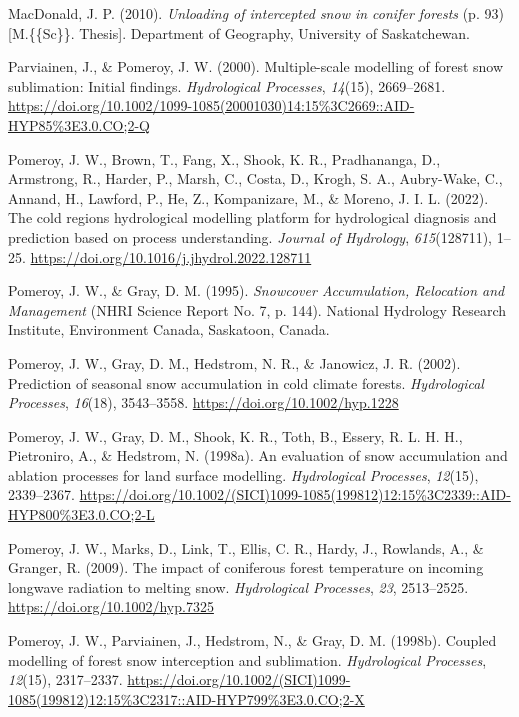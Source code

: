 \documentclass[
]{agujournal2019}
\newlength{\cslhangindent}
\newenvironment{CSLReferences}[2] %
 {\begin{list}{}{%
  \setlength{\itemindent}{0pt}
  \setlength{\leftmargin}{0pt}
  \setlength{\parsep}{0pt}
  \ifodd #1
   \setlength{\leftmargin}{\cslhangindent}
   \setlength{\itemindent}{-1\cslhangindent}
  \fi
  \setlength{\itemsep}{#2\baselineskip}}}
 {\end{list}}
\begin{document}
\begin{CSLReferences}{1}{0}
MacDonald, J. P. (2010). \emph{Unloading of intercepted snow in conifer
forests} (p. 93) {[}M.\{\{Sc\}\}. Thesis{]}. Department of Geography,
University of Saskatchewan.

Parviainen, J., \& Pomeroy, J. W. (2000). Multiple-scale modelling of
forest snow sublimation: {Initial} findings. \emph{Hydrological
Processes}, \emph{14}(15), 2669--2681.
\url{https://doi.org/10.1002/1099-1085(20001030)14:15\%3C2669::AID-HYP85\%3E3.0.CO;2-Q}

Pomeroy, J. W., Brown, T., Fang, X., Shook, K. R., Pradhananga, D.,
Armstrong, R., Harder, P., Marsh, C., Costa, D., Krogh, S. A.,
Aubry-Wake, C., Annand, H., Lawford, P., He, Z., Kompanizare, M., \&
Moreno, J. I. L. (2022). The cold regions hydrological modelling
platform for hydrological diagnosis and prediction based on process
understanding. \emph{Journal of Hydrology}, \emph{615}(128711), 1--25.
\url{https://doi.org/10.1016/j.jhydrol.2022.128711}

Pomeroy, J. W., \& Gray, D. M. (1995). \emph{Snowcover {Accumulation},
{Relocation} and {Management}} (NHRI Science Report No. 7, p. 144).
National Hydrology Research Institute, Environment Canada, Saskatoon,
Canada.

Pomeroy, J. W., Gray, D. M., Hedstrom, N. R., \& Janowicz, J. R. (2002).
Prediction of seasonal snow accumulation in cold climate forests.
\emph{Hydrological Processes}, \emph{16}(18), 3543--3558.
\url{https://doi.org/10.1002/hyp.1228}

Pomeroy, J. W., Gray, D. M., Shook, K. R., Toth, B., Essery, R. L. H.
H., Pietroniro, A., \& Hedstrom, N. (1998a). An evaluation of snow
accumulation and ablation processes for land surface modelling.
\emph{Hydrological Processes}, \emph{12}(15), 2339--2367.
\url{https://doi.org/10.1002/(SICI)1099-1085(199812)12:15\%3C2339::AID-HYP800\%3E3.0.CO;2-L}

Pomeroy, J. W., Marks, D., Link, T., Ellis, C. R., Hardy, J., Rowlands,
A., \& Granger, R. (2009). The impact of coniferous forest temperature
on incoming longwave radiation to melting snow. \emph{Hydrological
Processes}, \emph{23}, 2513--2525.
\url{https://doi.org/10.1002/hyp.7325}

Pomeroy, J. W., Parviainen, J., Hedstrom, N., \& Gray, D. M. (1998b).
Coupled modelling of forest snow interception and sublimation.
\emph{Hydrological Processes}, \emph{12}(15), 2317--2337.
\url{https://doi.org/10.1002/(SICI)1099-1085(199812)12:15\%3C2317::AID-HYP799\%3E3.0.CO;2-X}


\end{CSLReferences}
\end{document}
